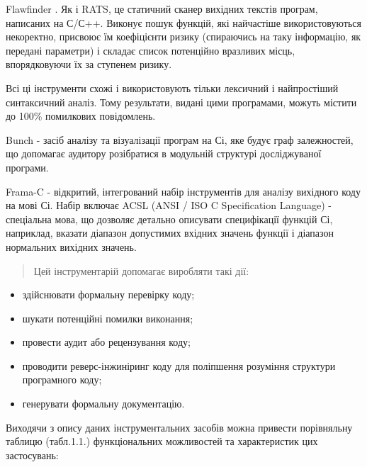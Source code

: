 Flawfinder . Як і RATS, це статичний сканер вихідних текстів програм, написаних на С/С++. Виконує пошук функцій, які найчастіше використовуються некоректно, присвоює їм коефіцієнти ризику (спираючись на таку інформацію, як передані параметри) і складає список потенційно вразливих місць, впорядковуючи їх за ступенем ризику.

Всі ці інструменти схожі і використовують тільки лексичний і найпростіший синтаксичний аналіз. Тому результати, видані цими програмами, можуть містити до 100\% помилкових повідомлень.

Bunch - засіб аналізу та візуалізації програм на Сі, яке будує граф залежностей, що допомагає аудитору розібратися в модульній структурі досліджуваної програми.

Frama-C - відкритий, інтегрований набір інструментів для аналізу вихідного коду на мові Сі. Набір включає ACSL (ANSI / ISO C Specification Language) - спеціальна мова, що дозволяє детально описувати специфікації функцій Сі, наприклад, вказати діапазон допустимих вхідних значень функції і діапазон нормальних вихідних значень.
\begin{quote}

Цей інструментарій допомагає виробляти такі дії:
\end{quote}
\begin{itemize}
\item {} 
здійснювати формальну перевірку коду;

\item {} 
шукати потенційні помилки виконання;

\item {} 
провести аудит або рецензування коду;

\item {} 
проводити реверс-інжиніринг коду для поліпшення розуміння структури програмного коду;

\item {} 
генерувати формальну документацію.

\end{itemize}

Виходячи з опису даних інструментальних засобів можна привести порівняльну таблицю (табл.1.1.) функціональних можливостей та характеристик цих застосувань:

